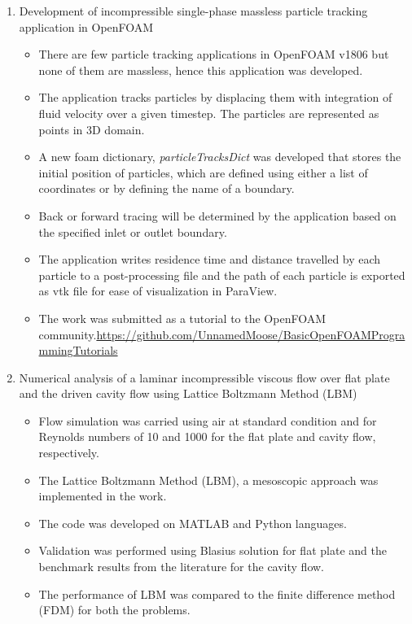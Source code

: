 \begin{enumerate}
	\item Development of incompressible single-phase massless particle tracking application in OpenFOAM
		\begin{itemize}
			\item There are few particle tracking applications in OpenFOAM v1806 but none of them are massless,
				hence this application was developed.
			\item The application tracks particles by displacing them with integration of fluid velocity
				over a given timestep. The particles are represented as points in 3D domain.
			\item A new foam dictionary, \textit{particleTracksDict} was developed that stores the
				initial position of particles, which are defined using either a list of coordinates or
				by defining the name of a boundary.
			\item Back or forward tracing will be determined by the application based on the specified
				inlet or outlet boundary.
			\item The application writes residence time and distance travelled by each particle to a
				post-processing file and the path of each particle is exported as vtk file for ease
				of visualization in ParaView.
			\item The work was submitted as a tutorial to the OpenFOAM community.\url{https://github.com/UnnamedMoose/BasicOpenFOAMProgrammingTutorials}
		\end{itemize}
	\item Numerical analysis of a laminar incompressible viscous flow over flat plate and the driven cavity flow using
		Lattice Boltzmann Method (LBM)
		\begin{itemize}
			\item Flow simulation was carried using air at standard condition and for Reynolds numbers of 10 and 1000
				for the flat plate and cavity flow, respectively.
			\item The Lattice Boltzmann Method (LBM), a mesoscopic approach was implemented in the work.
			\item The code was developed on MATLAB and Python languages.
			\item Validation was performed using Blasius solution for flat plate and the benchmark results from the literature for the cavity flow.
			\item The performance of LBM was compared to the finite difference method (FDM) for both the problems.
		\end{itemize}


\end{enumerate}
